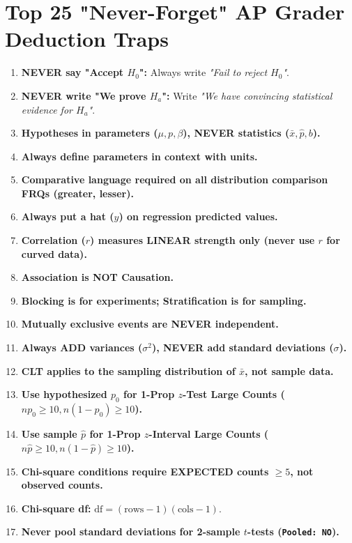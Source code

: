 \documentclass[11pt,oneside,openany]{book}
\begin{document}
\chapter{Top 25 "Never-Forget" AP Grader Deduction Traps}

\begin{enumerate}[label=\textbf{\arabic*.}, leftmargin=*]
    \item \textbf{NEVER say "Accept $H_0$":} Always write \emph{"Fail to reject $H_0$"}.
    \item \textbf{NEVER write "We prove $H_a$":} Write \emph{"We have convincing statistical evidence for $H_a$"}.
    \item \textbf{Hypotheses in parameters ($\mu, p, \beta$), NEVER statistics ($\bar{x}, \hat{p}, b$).}
    \item \textbf{Always define parameters in context with units.}
    \item \textbf{Comparative language required on all distribution comparison FRQs (greater, lesser).}
    \item \textbf{Always put a hat ($\hat{y}$) on regression predicted values.}
    \item \textbf{Correlation ($r$) measures LINEAR strength only (never use $r$ for curved data).}
    \item \textbf{Association is NOT Causation.}
    \item \textbf{Blocking is for experiments; Stratification is for sampling.}
    \item \textbf{Mutually exclusive events are NEVER independent.}
    \item \textbf{Always ADD variances ($\sigma^2$), NEVER add standard deviations ($\sigma$).}
    \item \textbf{CLT applies to the sampling distribution of $\bar{x}$, not sample data.}
    \item \textbf{Use hypothesized $p_0$ for 1-Prop $z$-Test Large Counts ($np_0 \ge 10, n(1-p_0) \ge 10$).}
    \item \textbf{Use sample $\hat{p}$ for 1-Prop $z$-Interval Large Counts ($n\hat{p} \ge 10, n(1-\hat{p}) \ge 10$).}
    \item \textbf{Chi-square conditions require EXPECTED counts $\ge 5$, not observed counts.}
    \item \textbf{Chi-square df:} $\text{df} = (\text{rows}-1)(\text{cols}-1)$.
    \item \textbf{Never pool standard deviations for 2-sample $t$-tests (\texttt{Pooled: NO}).}

\end{enumerate}
\end{document}
